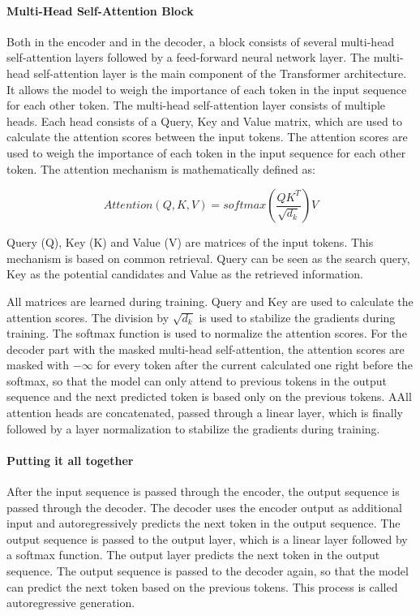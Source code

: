 \paragraph{Multi-Head Self-Attention Block}

Both in the encoder and in the decoder, a block consists of several multi-head self-attention layers followed by a feed-forward neural network layer. The multi-head self-attention layer is the main component of the Transformer architecture. It allows the model to weigh the importance of each token in the input sequence for each other token. The multi-head self-attention layer consists of multiple heads. Each head consists of a Query, Key and Value matrix, which are used to calculate the attention scores between the input tokens. The attention scores are used to weigh the importance of each token in the input sequence for each other token. The attention mechanism is mathematically defined as:

$$Attention(Q,K, V) = softmax(\frac{QK^T}{\sqrt{d_k}})V$$

Query (Q), Key (K) and Value (V) are matrices of the input tokens. This mechanism is based on common retrieval. Query can be seen as the search query, Key as the potential candidates and Value as the retrieved information.

All matrices are learned during training. Query and Key are used to calculate the attention scores. The division by $\sqrt{d_k}$ is used to stabilize the gradients during training. The softmax function is used to normalize the attention scores. For the decoder part with the masked multi-head self-attention, the attention scores are masked with $-\infty$ for every token after the current calculated one right before the softmax, so that the model can only attend to previous tokens in the output sequence and the next predicted token is based only on the previous tokens. AAll attention heads are concatenated, passed through a linear layer, which is finally followed by a layer normalization to stabilize the gradients during training. 

\paragraph{Putting it all together}
After the input sequence is passed through the encoder, the output sequence is passed through the decoder. The decoder uses the encoder output as additional input and autoregressively predicts the next token in the output sequence. The output sequence is passed to the output layer, which is a linear layer followed by a softmax function. The output layer predicts the next token in the output sequence. The output sequence is passed to the decoder again, so that the model can predict the next token based on the previous tokens. This process is called autoregressive generation.

